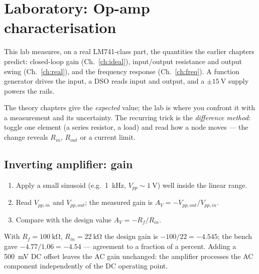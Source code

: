 \documentclass[11pt,a4paper,oneside]{book}
\begin{document}
\chapter{Laboratory: Op-amp characterisation}\label{ch:lab-opamp}

This lab measures, on a real LM741-class part, the quantities the earlier chapters
predict: closed-loop gain (Ch.~\ref{ch:ideal}), input/output resistance and output
swing (Ch.~\ref{ch:real}), and the frequency response (Ch.~\ref{ch:freq}). A
function generator drives the input, a DSO reads input and output, and a
$\pm\qty{15}{\volt}$ supply powers the rails.

\begin{keyidea}
The theory chapters give the \emph{expected} value; the lab is where you confront
it with a measurement and its uncertainty. The recurring trick is the
\emph{difference method}: toggle one element (a series resistor, a load) and read
how a node moves --- the change reveals $R_{in}$, $R_{out}$ or a current limit.
\end{keyidea}

\section{Inverting amplifier: gain}

\begin{protocol}
\begin{enumerate}[leftmargin=1.5cm]
  \item Apply a small sinusoid (e.g.\ \qty{1}{\kilo\hertz}, $V_{pp}\sim\qty{1}{\volt}$)
        well inside the linear range.
  \item Read $V_{pp,in}$ and $V_{pp,out}$; the measured gain is
        $A_{V}=-V_{pp,out}/V_{pp,in}$.
  \item Compare with the design value $A_{V}=-R_f/R_{in}$.
\end{enumerate}
\end{protocol}

With $R_f=\qty{100}{\kilo\ohm}$, $R_{in}=\qty{22}{\kilo\ohm}$ the design gain is
$-100/22=-4.545$; the bench gave $-4.77/1.06=-4.54$ --- agreement to a fraction of
a percent. Adding a \qty{500}{\milli\volt} DC offset leaves the AC gain unchanged:
the amplifier processes the AC component independently of the DC operating point.
\end{document}
